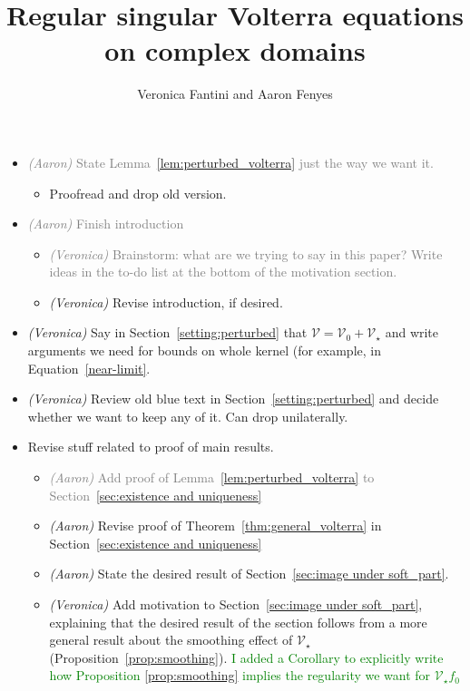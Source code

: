 \documentclass{article}
\title{Regular singular Volterra equations on complex domains}
\author{Veronica Fantini and Aaron Fenyes}
\date{}
\theoremstyle{plain}
\newcommand{\volterra}{\mathcal{V}}
\newcommand{\hardpart}{\mathcal{V}_0}
\newcommand{\softpart}{\mathcal{V}_\star}
\newenvironment{brainstorm}{\color{violet}\begin{itemize}}{\end{itemize}\color{black}}
\begin{document}
\maketitle
\begin{brainstorm}
\item \textcolor{gray}{\textit{(Aaron)} State Lemma~\ref{lem:perturbed_volterra} just the way we want it.}
\begin{itemize}
    \item Proofread and drop old version.
\end{itemize}
\item \textcolor{gray}{\textit{(Aaron)} Finish introduction}
\begin{itemize}
\item \textcolor{gray}{\textit{(Veronica)} Brainstorm: what are we trying to say in this paper? Write ideas in the to-do list at the bottom of the motivation section.}
\item \textit{(Veronica)} Revise introduction, if desired.
\end{itemize}
\color{gray}
\item \textit{(Veronica)} Say in Section~\ref{setting:perturbed} that $\volterra = \hardpart + \softpart$ and write arguments we need for bounds on whole kernel (for example, in Equation~\ref{near-limit}.
\color{gray}
\item \textit{(Veronica)} Review old blue text in Section~\ref{setting:perturbed} and decide whether we want to keep any of it. Can drop unilaterally. 
\color{violet}
\item Revise stuff related to proof of main results.
\begin{itemize}
        \item \textcolor{gray}{\textit{(Aaron)} Add proof of Lemma~\ref{lem:perturbed_volterra} to Section~\ref{sec:existence and uniqueness}}
        \item \textit{(Aaron)} Revise proof of Theorem~\ref{thm:general_volterra} in Section~\ref{sec:existence and uniqueness}
        \item \textit{(Aaron)} State the desired result of Section~\ref{sec:image under soft_part}.
        \color{gray}
        \item \textit{(Veronica)} Add motivation to Section~\ref{sec:image under soft_part}, explaining that the desired result of the section follows from a more general result about the smoothing effect of $\softpart$ (Proposition~\ref{prop:smoothing}). \textcolor{green}{I added a Corollary to explicitly write how Proposition \ref{prop:smoothing} implies the regularity we want for $\softpart f_0$}

\end{itemize}
\end{brainstorm}
\end{document}

